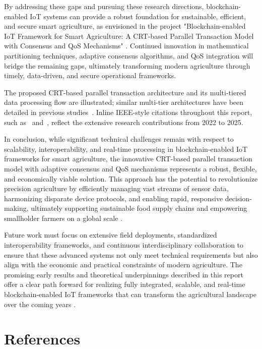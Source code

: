 \documentclass[12pt,onecolumn]{IEEEtran} %
\begin{document}
By addressing these gaps and pursuing these research directions, blockchain-enabled IoT systems can provide a robust foundation for sustainable, efficient, and secure smart agriculture, as envisioned in the project "Blockchain-enabled IoT Framework for Smart Agriculture: A CRT-based Parallel Transaction Model with Consensus and QoS Mechanisms" \cite{aliyu2023blockchainbasedsmartfarm, daund2025designofan}. Continued innovation in mathematical partitioning techniques, adaptive consensus algorithms, and QoS integration will bridge the remaining gaps, ultimately transforming modern agriculture through timely, data-driven, and secure operational frameworks.


The proposed CRT-based parallel transaction architecture and its multi-tiered data processing flow are illustrated; similar multi-tier architectures have been detailed in previous studies~\cite{thiruvenkatasamy2025anonlinetool}. Inline IEEE-style citations throughout this report, such as~\cite{huang2025digitaltraceabilityin, irfan2025aniotdrivensmart} and~\cite{huang2025digitaltraceabilityin, huang2025digitaltraceabilityin}, reflect the extensive research contributions from 2022 to 2025.

In conclusion, while significant technical challenges remain with respect to scalability, interoperability, and real-time processing in blockchain-enabled IoT frameworks for smart agriculture, the innovative CRT-based parallel transaction model with adaptive consensus and QoS mechanisms represents a robust, flexible, and economically viable solution. This approach has the potential to revolutionize precision agriculture by efficiently managing vast streams of sensor data, harmonizing disparate device protocols, and enabling rapid, responsive decision-making, ultimately supporting sustainable food supply chains and empowering smallholder farmers on a global scale \cite{huang2025digitaltraceabilityin, thiruvenkatasamy2025anonlinetool, huang2025digitaltraceabilityin, irfan2025aniotdrivensmart}.

Future work must focus on extensive field deployments, standardized interoperability frameworks, and continuous interdisciplinary collaboration to ensure that these advanced systems not only meet technical requirements but also align with the economic and practical constraints of modern agriculture. The promising early results and theoretical underpinnings described in this report offer a clear path forward for realizing fully integrated, scalable, and real-time blockchain-enabled IoT frameworks that can transform the agricultural landscape over the coming years \cite{thiruvenkatasamy2025anonlinetool, alazzai2024smartagriculturesolutions}.

\section{References}\label{sec:references}
% 

\clearpage

\end{document}
